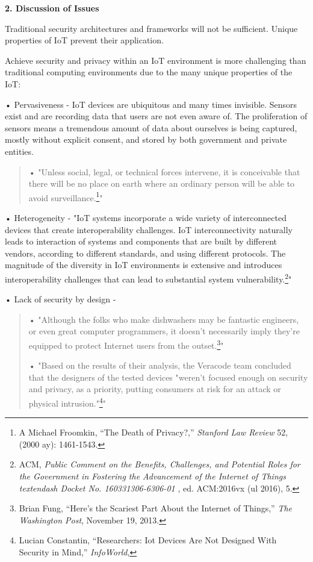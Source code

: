 \textbf{2. Discussion of Issues}

Traditional security architectures and frameworks will not be
sufficient. Unique properties of IoT prevent their application.

Achieve security and privacy within an IoT environment is more
challenging than traditional computing environments due to the many
unique properties of the IoT:

• Pervasiveness - IoT devices are ubiquitous and many times invisible.
Sensors exist and are recording data that users are not even aware of.
The proliferation of sensors means a tremendous amount of data about
ourselves is being captured, mostly without explicit consent, and stored
by both government and private entities.

\begin{quote}
• "Unless social, legal, or technical forces intervene, it is
conceivable that there will be no place on earth where an ordinary
person will be able to avoid surveillance.\footnote{A Michael Froomkin,
  ``The Death of Privacy?,'' \emph{Stanford Law Review} 52, (2000 ay):
  1461-1543.}"
\end{quote}

• Heterogeneity - "IoT systems incorporate a wide variety of
interconnected devices that create interoperability challenges. IoT
interconnectivity naturally leads to interaction of systems and
components that are built by different vendors, according to different
standards, and using different protocols. The magnitude of the diversity
in IoT environments is extensive and introduces interoperability
challenges that can lead to substantial system vulnerability.\footnote{ACM,
  \emph{Public Comment on the Benefits, Challenges, and Potential Roles
  for the Government in Fostering the Advancement of the Internet of
  Things textendash Docket No. 160331306-6306-01} , ed. ACM:2016vx (ul
  2016), 5.}"

• Lack of security by design -

\begin{quote}
• "Although the folks who make dishwashers may be fantastic engineers,
or even great computer programmers, it doesn't necessarily imply they're
equipped to protect Internet users from the outset.\footnote{Brian Fung,
  ``Here's the Scariest Part About the Internet of Things,'' \emph{The
  Washington Post}, November 19, 2013.}"

• "Based on the results of their analysis, the Veracode team concluded
that the designers of the tested devices "weren't focused enough on
security and privacy, as a priority, putting consumers at risk for an
attack or physical intrusion."\footnote{Lucian Constantin,
  ``Researchers: Iot Devices Are Not Designed With Security in Mind,''
  \emph{InfoWorld},}"
\end{quote}

